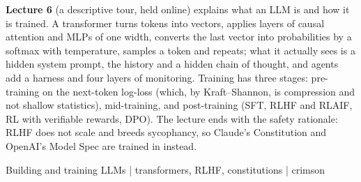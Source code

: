 \textbf{Lecture 6} (a descriptive tour, held online) explains what an LLM is and how it is trained. A transformer turns tokens into vectors, applies layers of causal attention and MLPs of one width, converts the last vector into probabilities by a softmax with temperature, samples a token and repeats; what it actually sees is a hidden system prompt, the history and a hidden chain of thought, and agents add a harness and four layers of monitoring. Training has three stages: pre-training on the next-token log-loss (which, by Kraft--Shannon, is compression and not shallow statistics), mid-training, and post-training (SFT, RLHF and RLAIF, RL with verifiable rewards, DPO). The lecture ends with the safety rationale: RLHF does not scale and breeds sycophancy, so Claude's Constitution and OpenAI's Model Spec are trained in instead.

Building and training LLMs | transformers, RLHF, constitutions | crimson
